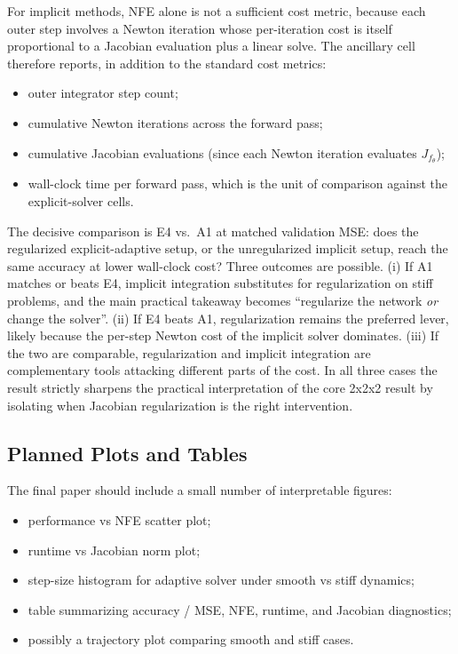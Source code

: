 \documentclass[11pt]{article}
\begin{document}
For implicit methods, NFE alone is not a sufficient cost metric, because each outer step involves a Newton iteration whose per-iteration cost is itself proportional to a Jacobian evaluation plus a linear solve. The ancillary cell therefore reports, in addition to the standard cost metrics:
\begin{itemize}[leftmargin=2em]
    \item outer integrator step count;
    \item cumulative Newton iterations across the forward pass;
    \item cumulative Jacobian evaluations (since each Newton iteration evaluates $J_{f_{\theta}}$);
    \item wall-clock time per forward pass, which is the unit of comparison against the explicit-solver cells.
\end{itemize}
The decisive comparison is E4 vs.\ A1 at matched validation MSE: does the regularized explicit-adaptive setup, or the unregularized implicit setup, reach the same accuracy at lower wall-clock cost? Three outcomes are possible. (i) If A1 matches or beats E4, implicit integration substitutes for regularization on stiff problems, and the main practical takeaway becomes ``regularize the network \emph{or} change the solver''. (ii) If E4 beats A1, regularization remains the preferred lever, likely because the per-step Newton cost of the implicit solver dominates. (iii) If the two are comparable, regularization and implicit integration are complementary tools attacking different parts of the cost. In all three cases the result strictly sharpens the practical interpretation of the core 2x2x2 result by isolating when Jacobian regularization is the right intervention.

\subsection{Planned Plots and Tables}

The final paper should include a small number of interpretable figures:
\begin{itemize}[leftmargin=2em]
    \item performance vs NFE scatter plot;
    \item runtime vs Jacobian norm plot;
    \item step-size histogram for adaptive solver under smooth vs stiff dynamics;
    \item table summarizing accuracy / MSE, NFE, runtime, and Jacobian diagnostics;
    \item possibly a trajectory plot comparing smooth and stiff cases.
\end{itemize}
\end{document}
